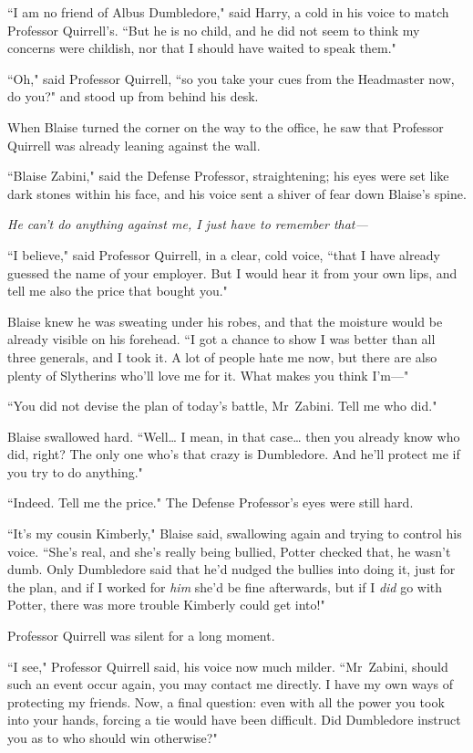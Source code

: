 ``I am no friend of Albus Dumbledore," said Harry, a cold in his voice to match Professor Quirrell's. ``But he is no child, and he did not seem to think my concerns were childish, nor that I should have waited to speak them."

``Oh," said Professor Quirrell, ``so you take your cues from the Headmaster now, do you?" and stood up from behind his desk.

\later

When Blaise turned the corner on the way to the office, he saw that Professor Quirrell was already leaning against the wall.

``Blaise Zabini," said the Defense Professor, straightening; his eyes were set like dark stones within his face, and his voice sent a shiver of fear down Blaise's spine.

\emph{He can't do anything against me, I just have to remember that—}

``I believe," said Professor Quirrell, in a clear, cold voice, ``that I have already guessed the name of your employer. But I would hear it from your own lips, and tell me also the price that bought you."

Blaise knew he was sweating under his robes, and that the moisture would be already visible on his forehead. ``I got a chance to show I was better than all three generals, and I took it. A lot of people hate me now, but there are also plenty of Slytherins who'll love me for it. What makes you think I'm—"

``You did not devise the plan of today's battle, Mr~Zabini. Tell me who did."

Blaise swallowed hard. ``Well{\ldots} I mean, in that case{\ldots} then you already know who did, right? The only one who's that crazy is Dumbledore. And he'll protect me if you try to do anything."

``Indeed. Tell me the price." The Defense Professor's eyes were still hard.

``It's my cousin Kimberly," Blaise said, swallowing again and trying to control his voice. ``She's real, and she's really being bullied, Potter checked that, he wasn't dumb. Only Dumbledore said that he'd nudged the bullies into doing it, just for the plan, and if I worked for \emph{him} she'd be fine afterwards, but if I \emph{did} go with Potter, there was more trouble Kimberly could get into!"

Professor Quirrell was silent for a long moment.

``I see," Professor Quirrell said, his voice now much milder. ``Mr~Zabini, should such an event occur again, you may contact me directly. I have my own ways of protecting my friends. Now, a final question: even with all the power you took into your hands, forcing a tie would have been difficult. Did Dumbledore instruct you as to who should win otherwise?"

